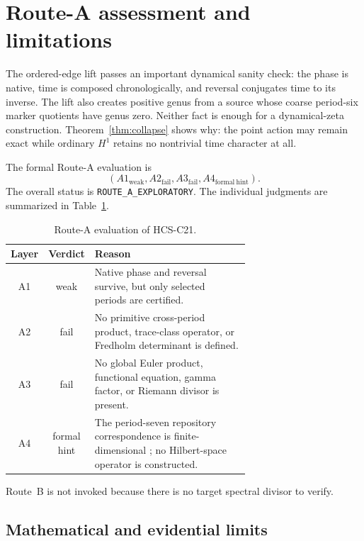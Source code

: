 \section{Route-A assessment and limitations}\label{sec:route-a}

The ordered-edge lift passes an important dynamical sanity check: the phase
is native, time is composed chronologically, and reversal conjugates time to
its inverse.  The lift also creates positive genus from a source whose
coarse period-six marker quotients have genus zero.  Neither fact is enough
for a dynamical-zeta construction.  Theorem~\ref{thm:collapse} shows why:
the point action may remain exact while ordinary $H^1$ retains no nontrivial
time character at all.

The formal Route-A evaluation is
\begin{equation}\label{eq:route-a-tuple}
 \boxed{
 (A1_{\mathrm{weak}},A2_{\mathrm{fail}},
  A3_{\mathrm{fail}},A4_{\mathrm{formal\ hint}}).}
\end{equation}
The overall status is \texttt{ROUTE\_A\_EXPLORATORY}.
The individual judgments are summarized in Table~\ref{tab:route-a}.
\begin{table}[htbp]
\centering
\begin{tabular}{ccp{0.67\linewidth}}
\toprule
Layer & Verdict & Reason \\
\midrule
A1 & weak
 & Native phase and reversal survive, but only selected periods are certified. \\
A2 & fail
 & No primitive cross-period product, trace-class operator, or Fredholm
 determinant is defined. \\
A3 & fail
 & No global Euler product, functional equation, gamma factor, or Riemann
 divisor is present. \\
A4 & formal hint
 & The period-seven repository correspondence is finite-dimensional
 \cite[Sec.~4]{hcsc20}; no Hilbert-space operator is constructed. \\
\bottomrule
\end{tabular}
\caption{Route-A evaluation of HCS-C21.}
\label{tab:route-a}
\end{table}
Route~B is not invoked because there is no target spectral divisor to verify.

\subsection{Mathematical and evidential limits}

